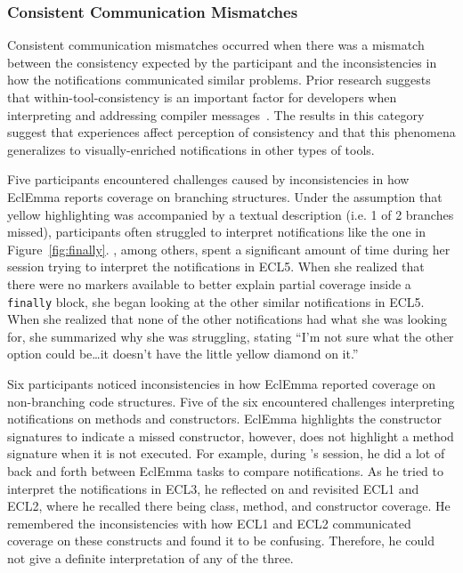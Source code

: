 \subsubsection{Consistent Communication Mismatches}\label{subsec:inconsistent}
Consistent communication mismatches occurred when there was a mismatch between the consistency expected by the participant and the inconsistencies in how the notifications communicated similar problems. 
Prior research suggests that within-tool-consistency is an important factor for developers when interpreting and addressing compiler messages~\cite{Traver:2010:Messages}.
The results in this category suggest that experiences affect perception of consistency and that this phenomena generalizes to visually-enriched notifications in other types of  tools.

Five participants encountered challenges caused by inconsistencies in how EclEmma reports coverage on branching structures. Under the assumption that yellow highlighting was accompanied by a textual description (i.e. 1 of 2 branches missed), participants often struggled to interpret notifications like the one in Figure~\ref{fig:finally}. , among others, spent a significant amount of time during her session trying to interpret the notifications in ECL5. When she realized that there were no markers available to better explain partial coverage inside a \texttt{finally} block, she began looking at the other similar notifications in ECL5. When she realized that none of the other notifications had what she was looking for, she summarized why she was struggling, stating ``I'm not sure what the other option could be\ldots it doesn't have the little yellow diamond on it.''

Six participants noticed inconsistencies in how EclEmma reported coverage on non-branching code structures. Five of the six encountered challenges interpreting notifications on methods and constructors. 
EclEmma highlights the constructor signatures to indicate a missed constructor, however, does not highlight a method signature when it is not executed. 
For example, during 's session, he did a lot of back and forth between EclEmma tasks to compare notifications. As he tried to interpret the notifications in ECL3, he reflected on and revisited ECL1 and ECL2, where he recalled there being class, method, and constructor coverage. He remembered the inconsistencies with how ECL1 and ECL2 communicated coverage on these constructs and found it to be confusing. Therefore, he could not give a definite interpretation of any of the three. 

